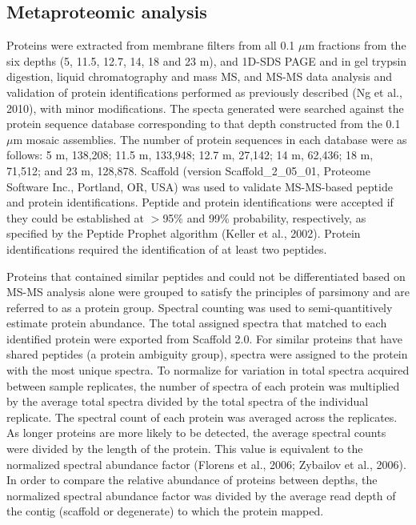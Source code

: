 \subsection{Metaproteomic analysis}
Proteins were extracted from membrane filters from all 0.1 $\mu$m fractions from the six depths (5, 11.5, 12.7, 14, 18 and 23 m), and \ac{1D-SDS PAGE} and in gel trypsin digestion, liquid chromatography and mass \ac{MS}, and \ac{MS-MS} data analysis and validation of protein identifications performed as previously described (Ng et al., 2010), with minor modifications.
The specta generated were searched against the protein sequence database corresponding to that depth constructed from the 0.1 $\mu$m mosaic assemblies. 
The number of protein sequences in each database were as follows: 5 m, 138,208; 11.5 m, 133,948; 12.7 m, 27,142; 14 m, 62,436; 18 m, 71,512; and 23 m, 128,878. 
Scaffold (version Scaffold\_2\_05\_01, Proteome Software Inc., Portland, OR, USA) was used to validate \ac{MS-MS}-based peptide and protein identifications. 
Peptide and protein identifications were accepted if they could be established at $>$95\% and 99\% probability, respectively, as specified by the Peptide Prophet algorithm (Keller et al., 2002). 
Protein identifications required the identification of at least two peptides.
 
Proteins that contained similar peptides and could not be differentiated based on \ac{MS-MS} analysis alone were grouped to satisfy the principles of parsimony and are referred to as a protein group. 
Spectral counting was used to semi-quantitively estimate protein abundance. 
The total assigned spectra that matched to each identified protein were exported from Scaffold 2.0. 
For similar proteins that have shared peptides (a protein ambiguity group), spectra were assigned to the protein with the most unique spectra. 
To normalize for variation in total spectra acquired between sample replicates, the number of spectra of each protein was multiplied by the average total spectra divided by the total spectra of the individual replicate. 
The spectral count of each protein was averaged across the replicates. 
As longer proteins are more likely to be detected, the average spectral counts were divided by the length of the protein. 
This value is equivalent to the normalized spectral abundance factor (Florens et al., 2006; Zybailov et al., 2006). 
In order to compare the relative abundance of proteins between depths, the normalized spectral abundance factor was divided by the average read depth of the contig (scaffold or degenerate) to which the protein mapped. 

